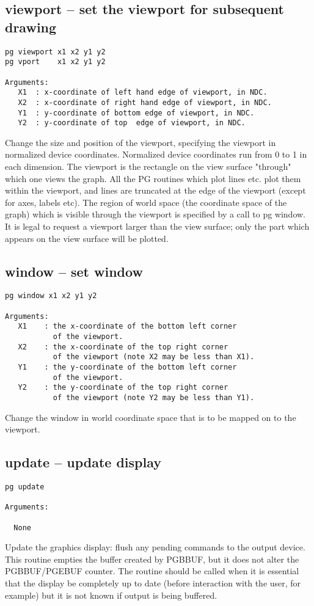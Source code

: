 \subsection{viewport -- set the viewport for subsequent drawing}
\begin{verbatim}
pg viewport x1 x2 y1 y2
pg vport    x1 x2 y1 y2

Arguments:
   X1  : x-coordinate of left hand edge of viewport, in NDC.
   X2  : x-coordinate of right hand edge of viewport, in NDC.
   Y1  : y-coordinate of bottom edge of viewport, in NDC.
   Y2  : y-coordinate of top  edge of viewport, in NDC.
\end{verbatim}
Change the size and position of the viewport, specifying
the viewport in normalized device coordinates.  Normalized
device coordinates run from 0 to 1 in each dimension. The
viewport is the rectangle on the view surface "through"
which one views the graph.  All the PG routines which plot lines
etc. plot them within the viewport, and lines are truncated at
the edge of the viewport (except for axes, labels etc).  
The region of world space (the coordinate space of the graph) 
which is visible through the viewport is specified by a call to 
pg window.  It is legal to request a viewport larger than the 
view surface; only the part which appears on the view surface 
will be plotted.



\subsection{window -- set window}
\begin{verbatim}
pg window x1 x2 y1 y2

Arguments:
   X1    : the x-coordinate of the bottom left corner
           of the viewport.
   X2    : the x-coordinate of the top right corner
           of the viewport (note X2 may be less than X1).
   Y1    : the y-coordinate of the bottom left corner
           of the viewport.
   Y2    : the y-coordinate of the top right corner
           of the viewport (note Y2 may be less than Y1).
\end{verbatim}
Change the window in world coordinate space that is to be mapped on
to the viewport.  



\subsection{update -- update display}
\begin{verbatim}
pg update

Arguments:

  None
\end{verbatim}
Update the graphics display: flush any pending commands to the
output device. This routine empties the buffer created by PGBBUF,
but it does not alter the PGBBUF/PGEBUF counter. The routine should
be called when it is essential that the display be completely up to
date (before interaction with the user, for example) but it is not
known if output is being buffered.

